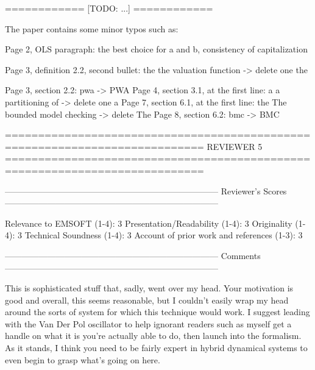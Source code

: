    ============
   [TODO: ...]
   ============


The paper contains some minor typos such as:

Page 2, OLS paragraph: the best choice for a and b, consistency of
capitalization

Page 3, definition 2.2, second bullet: the the valuation function -> delete
one the

Page 3, section 2.2: pwa -> PWA
Page 4, section 3.1, at the first line: a a partitioning of -> delete one
a
Page 7, section 6.1, at the first line: the The bounded model checking ->
delete The
Page 8, section 6.2: bmc -> BMC

============================================================================
                            REVIEWER 5
============================================================================


---------------------------------------------------------------------------
Reviewer's Scores
---------------------------------------------------------------------------

               Relevance to EMSOFT (1-4): 3
          Presentation/Readability (1-4): 3
                       Originality (1-4): 3
               Technical Soundness (1-4): 3
Account of prior work and references (1-3): 3


---------------------------------------------------------------------------
Comments
---------------------------------------------------------------------------

This is sophisticated stuff that, sadly, went over my head. Your motivation is
good and overall, this seems reasonable, but I couldn't easily wrap my head
around the sorts of system for which this technique would work. I suggest
leading with the Van Der Pol oscillator to help ignorant readers such as myself
get a handle on what it is you're actually able to do, then launch into the
formalism. As it stands, I think you need to be fairly expert in hybrid
dynamical systems to even begin to grasp what's going on here.

